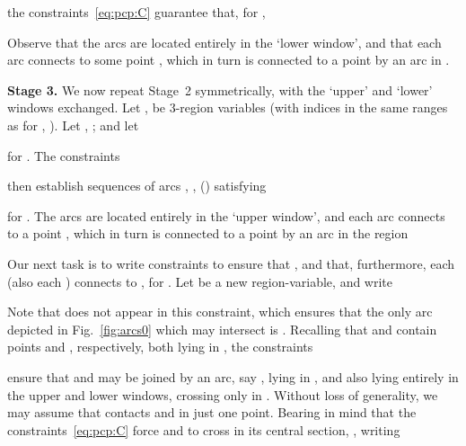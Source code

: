 \documentclass{article}
\begin{document}
the constraints~\eqref{eq:pcp:C} guarantee that, for ,

Observe that the arcs  are located entirely in the `lower
window', and that each arc  connects  to some point
, which in turn is connected to a point 
by an arc in .

\bigskip

\noindent
\textbf{Stage 3.}  We now repeat Stage~2 symmetrically, with the
`upper' and `lower' windows exchanged. Let ,
 be 3-region variables (with indices in the same
ranges as for , ). Let , ; and let

for . The constraints

then establish sequences of arcs , ,
() satisfying

for . The arcs  are located entirely in the
`upper window', and each arc  connects  to a point
, which in turn is connected to a point  by an arc in
the region

Our next task is to write constraints to ensure that , and
that, furthermore, each  (also each ) connects
 to , for . Let  be a new
region-variable, and write

Note that  does not appear in this constraint, which ensures that
the only arc depicted in Fig.~\ref{fig:arcs0} which  may intersect
is . Recalling that  and  contain
points  and , respectively, both lying in , the
constraints

ensure that  and  may be joined by an arc, say
, lying in , and also lying entirely in the upper
and lower windows, crossing  only in .  Without loss of
generality, we may assume that  contacts  and
 in just one point. Bearing in mind that the
constraints~\eqref{eq:pcp:C} force  and  to
cross  in its central section, , writing
\end{document}
